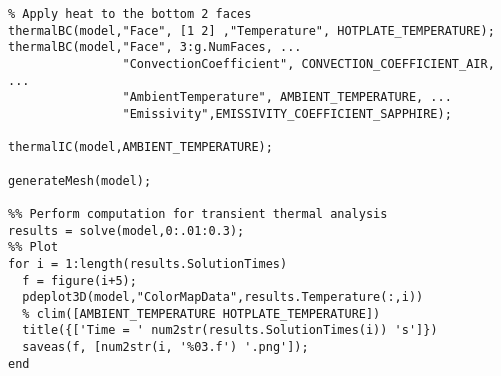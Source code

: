 \begin{lstlisting}
% Apply heat to the bottom 2 faces
thermalBC(model,"Face", [1 2] ,"Temperature", HOTPLATE_TEMPERATURE);
thermalBC(model,"Face", 3:g.NumFaces, ...
                "ConvectionCoefficient", CONVECTION_COEFFICIENT_AIR, ...
                "AmbientTemperature", AMBIENT_TEMPERATURE, ...
                "Emissivity",EMISSIVITY_COEFFICIENT_SAPPHIRE);

thermalIC(model,AMBIENT_TEMPERATURE);

generateMesh(model);

%% Perform computation for transient thermal analysis
results = solve(model,0:.01:0.3);
%% Plot
for i = 1:length(results.SolutionTimes)
  f = figure(i+5);
  pdeplot3D(model,"ColorMapData",results.Temperature(:,i))
  % clim([AMBIENT_TEMPERATURE HOTPLATE_TEMPERATURE])
  title({['Time = ' num2str(results.SolutionTimes(i)) 's']})
  saveas(f, [num2str(i, '%03.f') '.png']);
end




\end{lstlisting}

